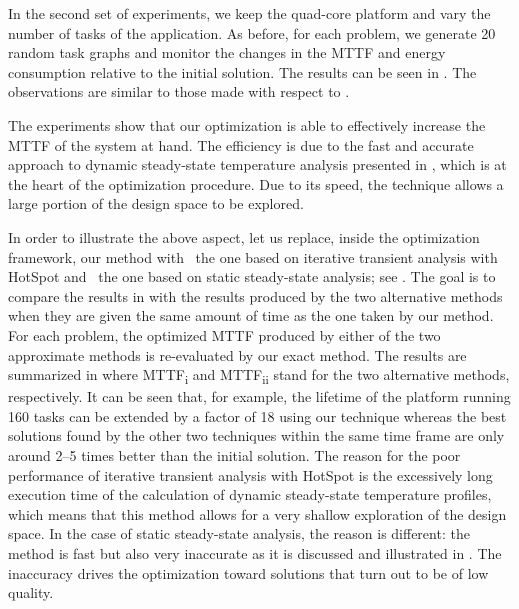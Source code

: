 In the second set of experiments, we keep the quad-core platform and vary the
number of tasks \nt of the application. As before, for each problem, we generate
20 random task graphs and monitor the changes in the \ac{MTTF} and energy
consumption relative to the initial solution. The results can be seen in
. The observations are similar to those made with
respect to .

The experiments show that our optimization is able to effectively increase the
\ac{MTTF} of the system at hand. The efficiency is due to the fast and accurate
approach to dynamic steady-state temperature analysis presented in
, which is at the heart of the optimization
procedure. Due to its speed, the technique allows a large portion of the design
space to be explored.

In order to illustrate the above aspect, let us replace, inside the optimization
framework, our method with \one~the one based on iterative transient analysis
with HotSpot and \two~the one based on static steady-state analysis; see
. The goal is to compare the results in
 with the results produced by the two alternative
methods when they are given the same amount of time as the one taken by our
method. For each problem, the optimized \ac{MTTF} produced by either of the two
approximate methods is re-evaluated by our exact method. The results are
summarized in  where \ac{MTTF}\textsubscript{i}
and \ac{MTTF}\textsubscript{ii} stand for the two alternative methods,
respectively. It can be seen that, for example, the lifetime of the platform
running 160 tasks can be extended by a factor of 18 using our technique whereas
the best solutions found by the other two techniques within the same time frame
are only around 2--5 times better than the initial solution. The reason for the
poor performance of iterative transient analysis with HotSpot is the excessively
long execution time of the calculation of dynamic steady-state temperature
profiles, which means that this method allows for a very shallow exploration of
the design space. In the case of static steady-state analysis, the reason is
different: the method is fast but also very inaccurate as it is discussed and
illustrated in . The inaccuracy drives the
optimization toward solutions that turn out to be of low quality.


